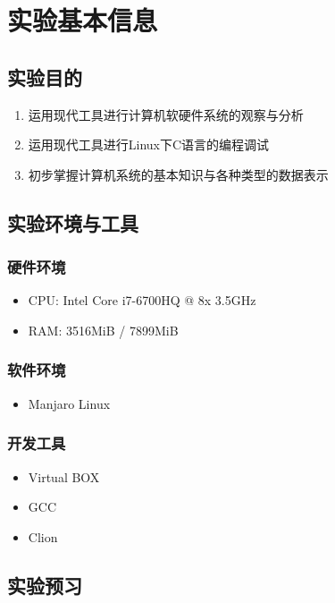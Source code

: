 \section{实验基本信息}

\subsection{实验目的}
\begin{enumerate}
	\item 运用现代工具进行计算机软硬件系统的观察与分析
	\item 运用现代工具进行Linux下C语言的编程调试
	\item 初步掌握计算机系统的基本知识与各种类型的数据表示
\end{enumerate}

\subsection{实验环境与工具}

\subsubsection{硬件环境}
\begin{itemize}
	\item CPU: Intel Core i7-6700HQ @ 8x 3.5GHz
	\item RAM: 3516MiB / 7899MiB
\end{itemize}

\subsubsection{软件环境}
\begin{itemize}
	\item Manjaro Linux

\end{itemize}

\subsubsection{开发工具}
\begin{itemize}
	\item Virtual BOX
	\item GCC
	\item Clion
\end{itemize}

\subsection{实验预习}

